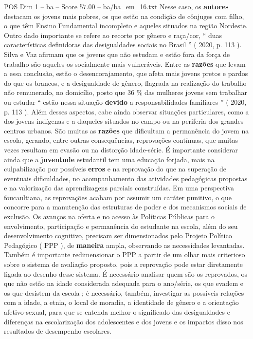 \begin{textsample}{POS Dim 1 – ba – Score 57.00 – ba/ba\_em\_16.txt}
Nesse caso, os \textbf{autores} destacam os jovens mais pobres, os que estão na condição de cônjuges com filho, o que têm Ensino Fundamental incompleto e aqueles situados na região Nordeste.
Outro dado importante se refere ao recorte por gênero e raça/cor, “ duas características definidoras das desigualdades sociais no Brasil ” ( 2020, p. 113 ).
Silva e Vaz afirmam que os jovens que não estudam e estão fora da força de trabalho são aqueles os socialmente mais vulneráveis.
Entre as \textbf{razões} que levam a essa conclusão, estão o desencorajamento, que afeta mais jovens pretos e pardos do que os brancos, e a desigualdade de gênero, flagrada na realização do trabalho não remunerado, no domicílio, posto que 36 \% das mulheres jovens sem trabalhar ou estudar “ estão nessa situação \textbf{devido} a responsabilidades familiares ” ( 2020, p. 113 ).
Além desses aspectos, cabe ainda observar situações particulares, como a dos jovens indígenas e a daqueles situados no campo ou na periferia dos grandes centros urbanos.
São muitas as \textbf{razões} que dificultam a permanência do jovem na escola, gerando, entre outras consequências, reprovações contínuas, que muitas vezes resultam em evasão ou na distorção idade-série.
É importante considerar ainda que a \textbf{juventude} estudantil tem uma educação forjada, mais na culpabilização por possíveis \textbf{erros} e na reprovação do que na superação de eventuais dificuldades, no acompanhamento das atividades pedagógicas propostas e na valorização das aprendizagens parciais construídas.
Em uma perspectiva foucaultiana, as reprovações acabam por assumir um caráter punitivo, o que concorre para a manutenção das estruturas de poder e dos mecanismos sociais de exclusão.
Os avanços na oferta e no acesso às Políticas Públicas para o envolvimento, participação e permanência do estudante na escola, além do seu desenvolvimento cognitivo, precisam ser dimensionados pelo Projeto Político Pedagógico ( PPP ), de \textbf{maneira} ampla, observando as necessidades levantadas.
Também é importante redimensionar o PPP a partir de um olhar mais criterioso sobre o sistema de avaliação proposto, pois a reprovação pode estar diretamente ligada ao desenho desse sistema.
É necessário analisar quem são os reprovados, os que não estão na idade considerada adequada para o ano/série, os que evadem e os que desistem da escola ; é necessário, também, investigar as possíveis relações com a idade, a etnia, o local de moradia, a identidade de gênero e a orientação afetivo-sexual, para que se entenda melhor o significado das desigualdades e diferenças na escolarização dos adolescentes e dos jovens e os impactos disso nos resultados de desempenho escolares.

\end{textsample}
